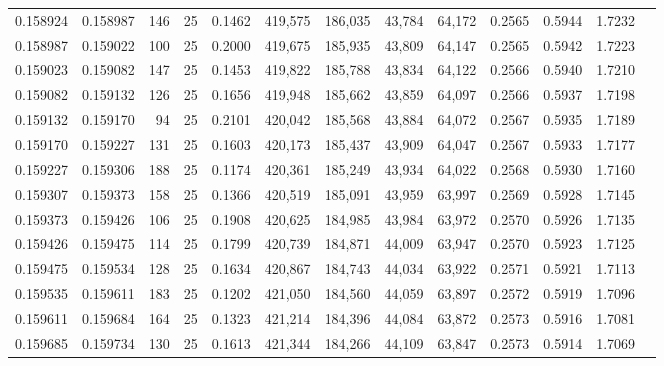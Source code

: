 \begin{tabular}{rrrrrrrrrrrrr}
0.158924 & 0.158987 &   146 &  25 &                                     0.1462 & 419,575 & 186,035 &  43,784 &  64,172 & 0.2565 & 0.5944 & 1.7232 \\
0.158987 & 0.159022 &   100 &  25 &                                     0.2000 & 419,675 & 185,935 &  43,809 &  64,147 & 0.2565 & 0.5942 & 1.7223 \\
0.159023 & 0.159082 &   147 &  25 &                                     0.1453 & 419,822 & 185,788 &  43,834 &  64,122 & 0.2566 & 0.5940 & 1.7210 \\
0.159082 & 0.159132 &   126 &  25 &                                     0.1656 & 419,948 & 185,662 &  43,859 &  64,097 & 0.2566 & 0.5937 & 1.7198 \\
0.159132 & 0.159170 &    94 &  25 &                                     0.2101 & 420,042 & 185,568 &  43,884 &  64,072 & 0.2567 & 0.5935 & 1.7189 \\
0.159170 & 0.159227 &   131 &  25 &                                     0.1603 & 420,173 & 185,437 &  43,909 &  64,047 & 0.2567 & 0.5933 & 1.7177 \\
0.159227 & 0.159306 &   188 &  25 &                                     0.1174 & 420,361 & 185,249 &  43,934 &  64,022 & 0.2568 & 0.5930 & 1.7160 \\
0.159307 & 0.159373 &   158 &  25 &                                     0.1366 & 420,519 & 185,091 &  43,959 &  63,997 & 0.2569 & 0.5928 & 1.7145 \\
0.159373 & 0.159426 &   106 &  25 &                                     0.1908 & 420,625 & 184,985 &  43,984 &  63,972 & 0.2570 & 0.5926 & 1.7135 \\
0.159426 & 0.159475 &   114 &  25 &                                     0.1799 & 420,739 & 184,871 &  44,009 &  63,947 & 0.2570 & 0.5923 & 1.7125 \\
0.159475 & 0.159534 &   128 &  25 &                                     0.1634 & 420,867 & 184,743 &  44,034 &  63,922 & 0.2571 & 0.5921 & 1.7113 \\
0.159535 & 0.159611 &   183 &  25 &                                     0.1202 & 421,050 & 184,560 &  44,059 &  63,897 & 0.2572 & 0.5919 & 1.7096 \\
0.159611 & 0.159684 &   164 &  25 &                                     0.1323 & 421,214 & 184,396 &  44,084 &  63,872 & 0.2573 & 0.5916 & 1.7081 \\
0.159685 & 0.159734 &   130 &  25 &                                     0.1613 & 421,344 & 184,266 &  44,109 &  63,847 & 0.2573 & 0.5914 & 1.7069 \\

\end{tabular}
